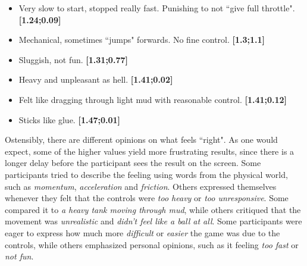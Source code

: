 \begin{itemize}[noitemsep,nolistsep]
\item Very slow to start, stopped really fast. Punishing to not ``give full throttle". \textbf{[1.24;0.09]}
\item Mechanical, sometimes ``jumps" forwards. No fine control. \textbf{[1.3;1.1]}
\item Sluggish, not fun. \textbf{[1.31;0.77]}
\item Heavy and unpleasant as hell. \textbf{[1.41;0.02]}
\item Felt like dragging through light mud with reasonable control. \textbf{[1.41;0.12]}
\item Sticks like glue. \textbf{[1.47;0.01]}
\end{itemize}

Ostensibly, there are different opinions on what feels ``right". As one would expect, some of the higher values yield more frustrating results, since there is a longer delay before the participant sees the result on the screen. Some participants tried to describe the feeling using words from the physical world, such as \textit{momentum}, \textit{acceleration} and \textit{friction}. Others expressed themselves whenever they felt that the controls were \textit{too heavy} or \textit{too unresponsive}. Some compared it to \textit{a heavy tank moving through mud}, while others critiqued that the movement was \textit{unrealistic} and \textit{didn't feel like a ball at all}. Some participants were eager to express how much more \textit{difficult} or \textit{easier} the game was due to the controls, while others emphasized personal opinions, such as it feeling \textit{too fast} or \textit{not fun}.


